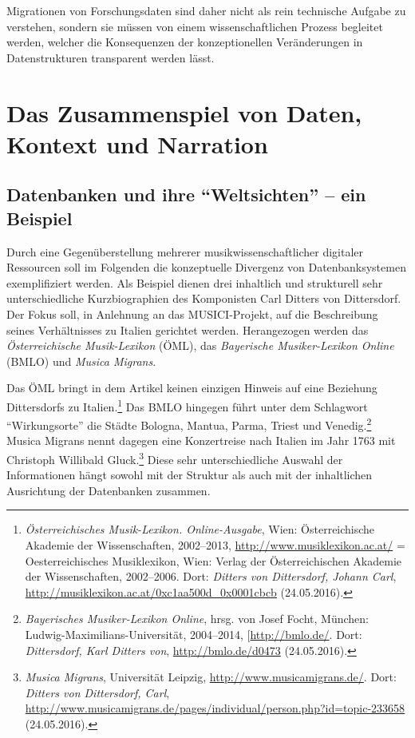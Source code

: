 \documentclass[a4paper,
fontsize=11pt,
oneside,
numbers=noperiodatend,
parskip=half-,
bibliography=totoc,
final
]{scrartcl}
\begin{document}
Migrationen von Forschungsdaten sind daher nicht als rein technische
Aufgabe zu verstehen, sondern sie müssen von einem wissenschaftlichen
Prozess begleitet werden, welcher die Konsequenzen der konzeptionellen
Veränderungen in Datenstrukturen transparent werden lässt.

\section*{Das Zusammenspiel von Daten, Kontext und
Narration}\label{das-zusammenspiel-von-daten-kontext-und-narration}

\subsection*{\texorpdfstring{Datenbanken und ihre \enquote{Weltsichten} --
ein
Beispiel}{Datenbanken und ihre Weltsichten -- ein Beispiel}}\label{datenbanken-und-ihre-weltsichten-ein-beispiel}

Durch eine Gegenüberstellung mehrerer musikwissenschaftlicher digitaler
Ressourcen soll im Folgenden die konzeptuelle Divergenz von
Datenbanksystemen exemplifiziert werden. Als Beispiel dienen drei
inhaltlich und strukturell sehr unterschiedliche Kurzbiographien des
Komponisten Carl Ditters von Dittersdorf. Der Fokus soll, in Anlehnung
an das MUSICI-Projekt, auf die Beschreibung seines Verhältnisses zu
Italien gerichtet werden. Herangezogen werden das \emph{Österreichische
Musik-Lexikon} (ÖML), das \emph{Bayerische Musiker-Lexikon Online}
(BMLO) und \emph{Musica Migrans}.

Das ÖML bringt in dem Artikel keinen einzigen Hinweis auf eine Beziehung
Dittersdorfs zu Italien.\footnote{\emph{Österreichisches Musik-Lexikon.
  Online-Ausgabe}, Wien: Österreichische Akademie der Wissenschaften,
  2002--2013, \url{http://www.musiklexikon.ac.at/} = Oesterreichisches
  Musiklexikon, Wien: Verlag der Österreichischen Akademie der
  Wissenschaften, 2002--2006. Dort: \emph{Ditters von Dittersdorf,
  Johann Carl}, \url{http://musiklexikon.ac.at/0xc1aa500d_0x0001cbcb}
  (24.05.2016).} Das BMLO hingegen führt unter dem Schlagwort
\enquote{Wirkungsorte} die Städte Bologna, Mantua, Parma, Triest und
Venedig.\footnote{\emph{Bayerisches Musiker-Lexikon Online}, hrsg. von
  Josef Focht, München: Ludwig-Maximilians-Universität, 2004--2014,
  {[}\url{http://bmlo.de/}. Dort: \emph{Dittersdorf, Karl Ditters von},
  \url{http://bmlo.de/d0473} (24.05.2016).} Musica Migrans nennt dagegen
eine Konzertreise nach Italien im Jahr 1763 mit Christoph Willibald
Gluck.\footnote{\emph{Musica Migrans}, Universität Leipzig,
  \url{http://www.musicamigrans.de/}. Dort: \emph{Ditters von
  Dittersdorf, Carl},
  \url{http://www.musicamigrans.de/pages/individual/person.php?id=topic-233658}
  (24.05.2016).} Diese sehr unterschiedliche Auswahl der Informationen
hängt sowohl mit der Struktur als auch mit der inhaltlichen Ausrichtung
der Datenbanken zusammen.
\end{document}
